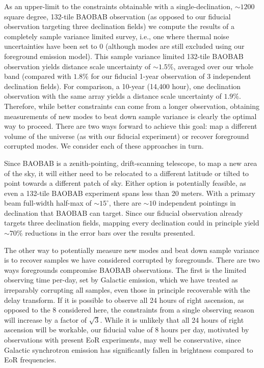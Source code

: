 \documentclass[10pt,iop]{emulateapj}
\begin{document}
As an upper-limit to the constraints obtainable with a single-declination, $\sim1200$ square degree, 
132-tile BAOBAB observation (as opposed to our fiducial observation targeting three declination 
fields)
we compute the results of a completely sample variance limited survey, i.e., one where thermal noise
uncertainties have been set to 0 (although modes are still excluded using our foreground
emission model).   
This sample variance
limited 132-tile BAOBAB observation yields distance scale uncertainty of $\sim1.5\%$, averaged over our whole band (compared with $1.8\%$ for our
fiducial 1-year observation of 3 independent declination fields).  
For comparison, a 10-year (14,400 hour), one declination observation with the same
array yields a distance scale uncertainty of $1.9\%$.
Therefore, while better constraints can come from a longer observation, obtaining measurements of 
new modes to beat down sample variance is clearly the optimal way to proceed.  There are two ways
forward to achieve this goal: map a different volume of the universe (as with our fiducial 
experiment) or recover foreground corrupted modes.  We consider each of these approaches in turn.

Since BAOBAB is a zenith-pointing, drift-scanning telescope, to map a new area of the sky, it will
either need to be relocated to a different latitude or tilted to point towards a different patch of sky.  Either option
is potentially feasible, as even a 132-tile BAOBAB experiment spans less than 20 meters.  With
a primary beam full-width half-max of $\sim 15^{\circ}$, there are $\sim10$ independent pointings
in declination that BAOBAB can target.  Since our fiducial observation already targets three
declination fields, mapping every declination could in principle yield $\sim70\%$ reductions
in the error bars over the results presented. 

The other way to potentially measure new modes and beat down sample variance is to recover samples
we have considered corrupted by foregrounds.  There are two ways foregrounds compromise BAOBAB
observations.  The first is the limited observing time per-day, set by Galactic emission,
which we have treated as irreparably corrupting all samples, even those in principle
recoverable with the delay transform.  If it is possible to observe all 24 hours of right ascension,
as opposed to the 8 considered here, the constraints from a single observing season will increase
by a factor of $\sqrt3$.  While it is unlikely that all 24 hours of right ascension
will be workable, our fiducial value of 8 hours per day, motivated by observations
with present EoR experiments, may well
be conservative, since Galactic synchrotron emission has significantly fallen in brightness
compared to EoR frequencies.
\end{document}
